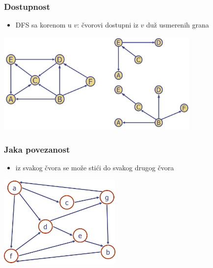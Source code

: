 \documentclass[compress,aspectratio=169]{beamer}
\begin{document}
\begin{frame}[fragile]
  \frametitle{Dostupnost}
  \begin{itemize}
    \item DFS  sa korenom u $v$: čvorovi dostupni iz $v$
      duž usmerenih grana 
  \end{itemize}
  \begin{center}
    \includegraphics[width=10cm]{asp-14-pic31.png}
  \end{center}
\end{frame}

\begin{frame}[fragile]
  \frametitle{Jaka povezanost}
  \begin{itemize}
    \item iz svakog čvora se može stići do svakog drugog čvora
  \end{itemize}
  \begin{center}
    \includegraphics[width=6cm]{asp-14-pic32.png}
  \end{center}
\end{frame}
\end{document}
